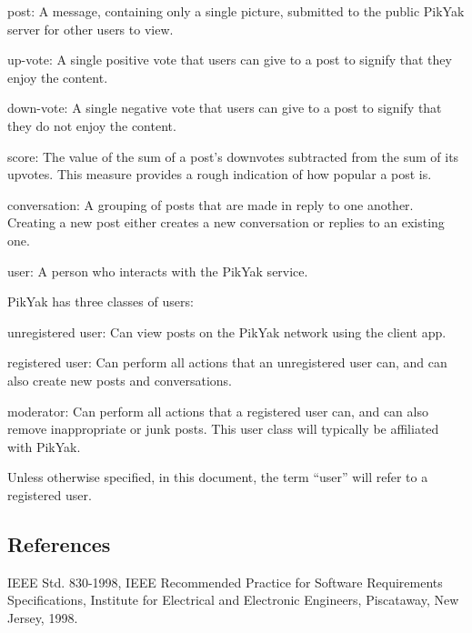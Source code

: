\documentclass[11pt]{scrartcl}
\begin{document}
        \begin{description*}
            \item[post:] A message, containing only a single picture, submitted to the public PikYak server for other users to view.

            \item[up-vote:] A single positive vote that users can give to a post to signify that they enjoy the content.

            \item[down-vote:] A single negative vote that users can give to a post to signify that they do not enjoy the content.

            \item[score:] The value of the sum of a post's downvotes subtracted from the sum of its upvotes.
                          This measure provides a rough indication of how popular a post is.

            \item[conversation:] A grouping of posts that are made in reply to one another.
                                 Creating a new post either creates a new conversation or replies to an existing one.

            \item[user:] A person who interacts with the PikYak service.

                         PikYak has three classes of users:

                         \begin{description*}
                             \item[unregistered user:] Can view posts on the PikYak network using the client app.
                             \item[registered user:] Can perform all actions that an unregistered user can, and can also create new posts and conversations.
                             \item[moderator:] Can perform all actions that a registered user can, and can also remove inappropriate or junk posts.  This user class will typically be affiliated with PikYak.
                         \end{description*}

                         Unless otherwise specified, in this document, the term ``user'' will refer to a registered user.
        \end{description*}

    \subsection{References}
        IEEE Std. 830-1998, IEEE Recommended Practice for Software Requirements Specifications, Institute for Electrical and Electronic Engineers, Piscataway, New Jersey, 1998.
\end{document}
